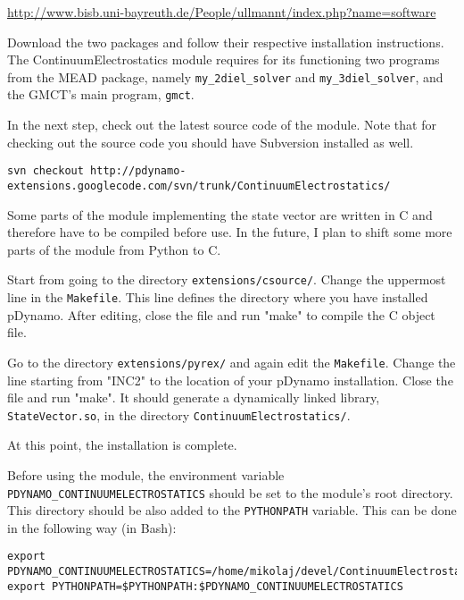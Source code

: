 \documentclass[a4paper,11pt]{article}
\newcommand{\modulename}{ContinuumElectrostatics\xspace}
\begin{document}
\url{http://www.bisb.uni-bayreuth.de/People/ullmannt/index.php?name=software}

Download the two packages and follow their respective installation
instructions.
%
The \modulename module requires for its functioning two programs
from the MEAD package, namely \texttt{my\_2diel\_solver} and \texttt{my\_3diel\_solver},
and the GMCT's main program, \texttt{gmct}.

\bigskip
In the next step, check out the latest source code of the module.
%
Note that for checking out the source code you should have Subversion installed
as well.

{\footnotesize \begin{lstlisting}
svn checkout http://pdynamo-extensions.googlecode.com/svn/trunk/ContinuumElectrostatics/
\end{lstlisting} }

\bigskip
Some parts of the module implementing the state vector are written in C and
therefore have to be compiled before use. 
%
In the future, I plan to shift some more parts of the module from Python to C.

\bigskip
Start from going to the directory \texttt{extensions/csource/}.
%
Change the uppermost line in the \texttt{Makefile}. 
%
This line defines the directory where you have installed pDynamo. 
%
After editing, close the file and run "make" to compile the C object file.

\bigskip
Go to the directory \texttt{extensions/pyrex/} and again edit the \texttt{Makefile}.
%
Change the line starting from "INC2" to the location of your pDynamo installation.
%
Close the file and run "make".
%
It should generate a dynamically linked library, \texttt{StateVector.so}, in 
the directory \texttt{Continuum\-Electrostatics/}.

\bigskip
At this point, the installation is complete.

\bigskip
Before using the module, the environment variable \texttt{PDYNAMO\_CONTINUUMELECTROSTATICS} 
should be set to the module's root directory.
%
This directory should be also added to the \texttt{PYTHONPATH} variable. 
%
This can be done in the following way (in Bash):

\newpage
{\footnotesize \begin{lstlisting}
export PDYNAMO_CONTINUUMELECTROSTATICS=/home/mikolaj/devel/ContinuumElectrostatics
export PYTHONPATH=$PYTHONPATH:$PDYNAMO_CONTINUUMELECTROSTATICS
\end{lstlisting} }
\end{document}
